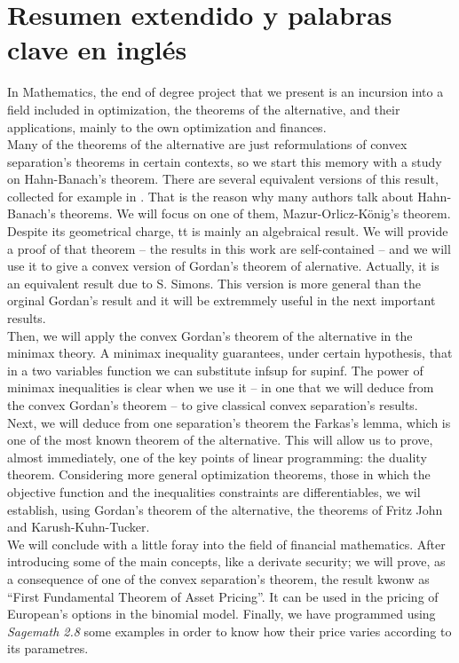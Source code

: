 \chapter{Resumen extendido y palabras clave en inglés}
In Mathematics, the end of degree project that we present is an incursion into a field included in optimization, the theorems of the alternative, and their applications, mainly to the own optimization and finances.\\

Many of the theorems of the alternative are just reformulations of convex separation's theorems in certain contexts, so we start this memory with a study on Hahn-Banach's theorem. There are several equivalent versions of this result, collected for example in \cite{schechter1996handbook}. That is the reason why many authors talk about Hahn-Banach's theorems. We will focus on one of them, Mazur-Orlicz-König's theorem. Despite its geometrical charge, tt is mainly an algebraical result. We will provide a proof of that theorem -- the results in this work are self-contained --  and we will use it to give a convex version  of Gordan's theorem of alernative. Actually, it is an equivalent result due to S. Simons. This version is more general than the orginal Gordan's result and it will be extremmely useful in the next important results. \\

Then, we will apply the convex Gordan's theorem of the alternative in the minimax theory. A minimax inequality guarantees, under certain hypothesis, that in a two variables function we can substitute inf\hspace{0.5mm}sup for sup\hspace{0.5mm}inf. The power of minimax inequalities is clear when we use it -- in one that we will deduce from the convex Gordan's theorem -- to give classical convex separation's results. \\

Next, we will deduce from one separation's theorem the Farkas's lemma, which is one of the most known theorem of the alternative. This will allow us to prove, almost immediately, one of the key points of linear programming: the duality theorem. Considering more general optimization theorems, those in which the objective function and the inequalities constraints are differentiables, we wil establish, using Gordan's theorem of the alternative, the theorems of Fritz John and Karush-Kuhn-Tucker.\\

We will conclude with a little foray into the field of financial mathematics. After introducing some of the main concepts, like a derivate security; we will prove, as a consequence of one of the convex separation's theorem, the result kwonw as ``First Fundamental Theorem of Asset Pricing''. It can be used in the pricing of European's options in the binomial model. Finally, we have programmed using \textit{Sagemath 2.8} some examples in order to know how their price varies according to its parametres.\\

